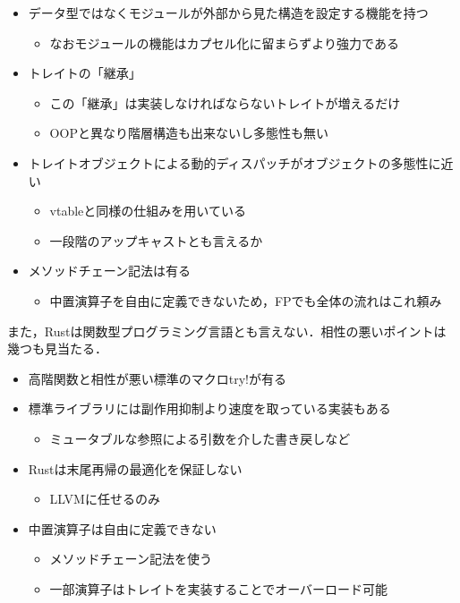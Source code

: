\begin{itemize}
\item データ型ではなくモジュールが外部から見た構造を設定する機能を持つ
  \begin{itemize}
  \item なおモジュールの機能はカプセル化に留まらずより強力である
  \end{itemize}
\item トレイトの「継承」
  \begin{itemize}
  \item この「継承」は実装しなければならないトレイトが増えるだけ
  \item OOPと異なり階層構造も出来ないし多態性も無い
  \end{itemize}
\item トレイトオブジェクトによる動的ディスパッチがオブジェクトの多態性に近い
  \begin{itemize}
  \item vtableと同様の仕組みを用いている
  \item 一段階のアップキャストとも言えるか
  \end{itemize}
\item メソッドチェーン記法は有る
  \begin{itemize}
  \item 中置演算子を自由に定義できないため，FPでも全体の流れはこれ頼み
  \end{itemize}
\end{itemize}

また，Rustは関数型プログラミング言語とも言えない．相性の悪いポイントは幾つも見当たる．

\begin{itemize}
\item 高階関数と相性が悪い標準のマクロtry!が有る
\item 標準ライブラリには副作用抑制より速度を取っている実装もある
  \begin{itemize}
  \item ミュータブルな参照による引数を介した書き戻しなど
  \end{itemize}
\item Rustは末尾再帰の最適化を保証しない
  \begin{itemize}
  \item LLVMに任せるのみ
  \end{itemize}
\item 中置演算子は自由に定義できない
  \begin{itemize}
  \item メソッドチェーン記法を使う
  \item 一部演算子はトレイトを実装することでオーバーロード可能
  \end{itemize}
\end{itemize}

